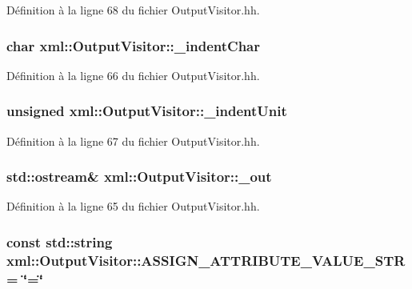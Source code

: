 Définition à la ligne 68 du fichier OutputVisitor.hh.

\hypertarget{classxml_1_1_output_visitor_a9b89adad1ba1e3ff2f64ad7cd6545361}{
\subsubsection[{\_\-indentChar}]{\setlength{\rightskip}{0pt plus 5cm}char {\bf xml::OutputVisitor::\_\-indentChar}}}
\label{classxml_1_1_output_visitor_a9b89adad1ba1e3ff2f64ad7cd6545361}


Définition à la ligne 66 du fichier OutputVisitor.hh.

\hypertarget{classxml_1_1_output_visitor_a55060d8246a1365089872aa4a500b03c}{
\subsubsection[{\_\-indentUnit}]{\setlength{\rightskip}{0pt plus 5cm}unsigned {\bf xml::OutputVisitor::\_\-indentUnit}}}
\label{classxml_1_1_output_visitor_a55060d8246a1365089872aa4a500b03c}


Définition à la ligne 67 du fichier OutputVisitor.hh.

\hypertarget{classxml_1_1_output_visitor_ab2e31d8a9675f88d96a89399ea894e83}{
\subsubsection[{\_\-out}]{\setlength{\rightskip}{0pt plus 5cm}std::ostream\& {\bf xml::OutputVisitor::\_\-out}}}
\label{classxml_1_1_output_visitor_ab2e31d8a9675f88d96a89399ea894e83}


Définition à la ligne 65 du fichier OutputVisitor.hh.

\hypertarget{classxml_1_1_output_visitor_a7eb4bfa043240d8d87fe47eb733057c4}{
\subsubsection[{ASSIGN\_\-ATTRIBUTE\_\-VALUE\_\-STR}]{\setlength{\rightskip}{0pt plus 5cm}const std::string {\bf xml::OutputVisitor::ASSIGN\_\-ATTRIBUTE\_\-VALUE\_\-STR} = \char`\"{}=\char`\"{}}}
\label{classxml_1_1_output_visitor_a7eb4bfa043240d8d87fe47eb733057c4}


